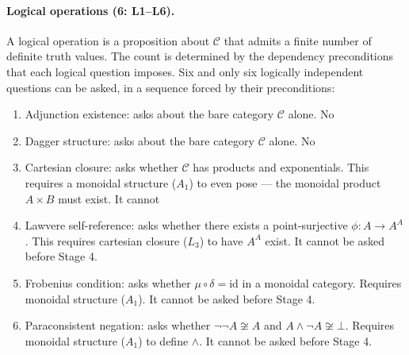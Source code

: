 \documentclass[12pt,a4paper]{article}
\makeatletter
\renewcommand{\_}{\ig@origunderscore\discretionary{}{}{}}
\makeatother
\begin{document}
\paragraph{Logical operations (6: L1--L6).}
A logical operation is a proposition about $\mathcal{C}$ that admits a finite number of definite truth values. The
count is determined by the dependency preconditions that each logical question imposes. Six and only six logically
independent questions can be asked, in a sequence forced by their preconditions:

\begin{enumerate}[nosep, leftmargin=2em]
 \item[\textbf{L1}] Adjunction existence: asks about the bare category $\mathcal{C}$ alone. No
 \item[\textbf{L2}] Dagger structure: asks about the bare category $\mathcal{C}$ alone. No
 \item[\textbf{L3}] Cartesian closure: asks whether $\mathcal{C}$ has products and exponentials. This requires a
monoidal structure ($A_1$) to even pose --- the monoidal product $A \times B$ must exist. It cannot
 \item[\textbf{L4}] Lawvere self-reference: asks whether there exists a point-surjective $\phi: A
 \to A^A$. This
requires cartesian closure ($L_3$) to have $A^A$ exist. It cannot be asked before Stage 4.
 \item[\textbf{L5}] Frobenius condition: asks whether $\mu\circ\delta = \text{id}$ in a monoidal category. Requires
monoidal structure ($A_1$). It cannot be asked before Stage 4.
 \item[\textbf{L6}] Paraconsistent negation: asks whether $\neg\neg A \not\cong A$ and $A \wedge
 \neg A \not\cong
\bot$. Requires monoidal structure ($A_1$) to define $\wedge$. It cannot be asked before Stage 4.
\end{enumerate}
\end{document}

